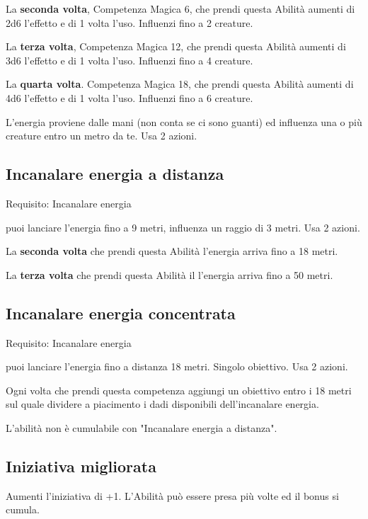 \documentclass[a4paper,11pt,twoside,openany]{book}
\begin{document}
La \textbf{seconda volta}, Competenza Magica 6, che prendi questa Abilità aumenti di 2d6 l'effetto e di 1 volta l'uso. Influenzi fino a 2 creature.

La \textbf{terza volta}, Competenza Magica 12, che prendi questa Abilità aumenti di 3d6 l'effetto e di 1 volta l'uso. Influenzi fino a 4 creature.

La \textbf{quarta volta}. Competenza Magica 18, che prendi questa Abilità aumenti di 4d6 l'effetto e di 1 volta l'uso. Influenzi fino a 6 creature.

L'energia proviene dalle mani (non conta se ci sono guanti) ed influenza una o più creature entro un metro da te. Usa 2 azioni.

\subsection{Incanalare energia a distanza}

Requisito: Incanalare energia

puoi lanciare l'energia fino a 9 metri, influenza un raggio di 3 metri. Usa 2 azioni.

La \textbf{seconda volta} che prendi questa Abilità l'energia arriva fino a 18 metri.

La \textbf{terza volta} che prendi questa Abilità il l'energia arriva fino a 50 metri.

\subsection{Incanalare energia concentrata}

Requisito: Incanalare energia

puoi lanciare l'energia fino a distanza 18 metri. Singolo obiettivo. Usa 2 azioni.

Ogni volta che prendi questa competenza aggiungi un obiettivo entro i 18 metri sul quale dividere a piacimento i dadi disponibili dell'incanalare energia.

L'abilità non è cumulabile con "Incanalare energia a distanza".

\subsection{Iniziativa migliorata}

Aumenti l'iniziativa di +1. L'Abilità può essere presa più volte ed il bonus si cumula.
\end{document}
